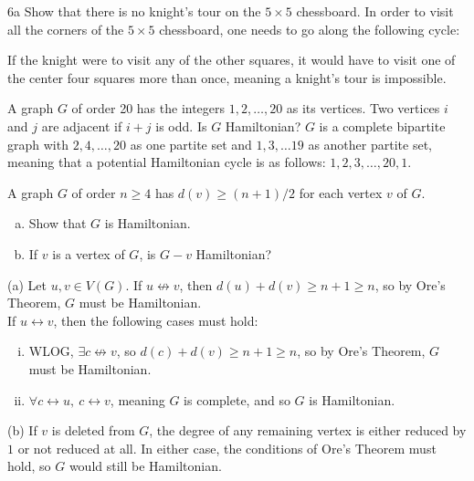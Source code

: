 \documentclass[9pt]{extarticle}
\title{}
\author{Avinash Iyer}
\date{}
\begin{document}
  \begin{problem}{6a}
    Show that there is no knight's tour on the $5\times 5$ chessboard.
    \tcblower
    In order to visit all the corners of the $5\times 5$ chessboard, one needs to go along the following cycle:
    \begin{center}
    \end{center}
    If the knight were to visit any of the other squares, it would have to visit one of the center four squares more than once, meaning a knight's tour is impossible.
  \end{problem}
  \begin{problem}{9}
    A graph $G$ of order 20 has the integers $1,2,\dots,20$ as its vertices. Two vertices $i$ and $j$ are adjacent if $i+j$ is odd. Is $G$ Hamiltonian?
    \tcblower
    $G$ is a complete bipartite graph with $2,4,\dots,20$ as one partite set and $1,3,\dots 19$ as another partite set, meaning that a potential Hamiltonian cycle is as follows: $1,2,3,\dots,20,1$.
  \end{problem}
  \begin{problem}{10}
    A graph $G$ of order $n\geq 4$ has $d(v) \geq (n+1)/2$ for each vertex $v$ of $G$.
    \begin{enumerate}[(a)]
      \item Show that $G$ is Hamiltonian.
      \item If $v$ is a vertex of $G$, is $G-v$ Hamiltonian?
    \end{enumerate}
    \tcblower
    \begin{problem}{(a)}
      Let $u,v\in V(G)$. If $u\not\leftrightarrow v$, then $d(u) + d(v) \geq n+1 \geq n$, so by Ore's Theorem, $G$ must be Hamiltonian.\\

      If $u\leftrightarrow v$, then the following cases must hold:
      \begin{enumerate}[(i)]
        \item WLOG, $\exists c\not\leftrightarrow v$, so $d(c) + d(v) \geq n+1 \geq n$, so by Ore's Theorem, $G$ must be Hamiltonian.
        \item $\forall c\leftrightarrow u,~c\leftrightarrow v$, meaning $G$ is complete, and so $G$ is Hamiltonian.
      \end{enumerate}
    \end{problem}
    \begin{problem}{(b)}
      If $v$ is deleted from $G$, the degree of any remaining vertex is either reduced by $1$ or not reduced at all. In either case, the conditions of Ore's Theorem must hold, so $G$ would still be Hamiltonian.
    \end{problem}
  \end{problem}
\end{document}
